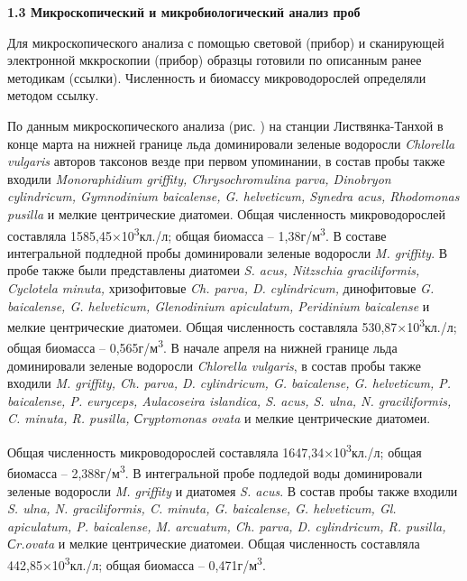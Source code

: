\documentclass[a4paper,12pt,openany,final]{extreport}
\begin{document}
\textbf{1.3 Микроскопический и микробиологический анализ проб }

Для микроскопического анализа с помощью световой (прибор) и сканирующей
электронной мккроскопии (прибор) образцы готовили по описанным ранее
методикам (ссылки). Численность и биомассу микроводорослей определяли
методом ссылку.

По данным микроскопического анализа (рис. ) на станции Листвянка-Танхой
в конце марта на нижней границе льда доминировали зеленые водоросли
\emph{Chlorella vulgaris} авторов таксонов везде при первом упоминании,
в состав пробы также входили \emph{Monoraphidium griffity,
Chrysochromulina parva, Dinobryon cylindricum, Gymnodinium baicalense,
G. helveticum, Synedra acus, Rhodomonas pusilla} и мелкие центрические
диатомеи. Общая численность микроводорослей составляла
1585,45×10\textsuperscript{3}кл./л; общая биомасса --
1,38г/м\textsuperscript{3}. В составе интегральной подледной пробы
доминировали зеленые водоросли \emph{M. griffity}. В пробе также были
представлены диатомеи \emph{S. acus, Nitzschia graciliformis, Cyclotela
minuta,} хризофитовые \emph{Ch. parva, D. cylindricum,} динофитовые
\emph{G. baicalense, G. helveticum, Glenodinium apiculatum, Peridinium
baicalense} и мелкие центрические диатомеи. Общая численность составляла
530,87×10\textsuperscript{3}кл./л; общая биомасса --
0,565г/м\textsuperscript{3}. В начале апреля на нижней границе льда
доминировали зеленые водоросли \emph{Chlorella vulgaris}, в состав пробы
также входили \emph{M. griffity, Ch. parva, D. cylindricum, G.
baicalense, G. helveticum, P. baicalense, P. euryceps, Aulacoseira
islandica, S. acus, S. ulna, N. graciliformis, C. minuta, R. pusilla,
Сryptomonas ovata} и мелкие центрические диатомеи.

Общая численность микроводорослей составляла
1647,34×10\textsuperscript{3}кл./л; общая биомасса --
2,388г/м\textsuperscript{3}. В интегральной пробе подледой воды
доминировали зеленые водоросли \emph{M. griffity} и диатомея \emph{S.
acus}. В состав пробы также входили \emph{S. ulna, N. graciliformis, C.
minuta, G. baicalense, G. helveticum, Gl. apiculatum, P. baicalense, M.
arcuatum, Ch. parva, D. cylindricum, R. pusilla, Сr.ovata} и мелкие
центрические диатомеи. Общая численность составляла
442,85×10\textsuperscript{3}кл./л; общая биомасса --
0,471г/м\textsuperscript{3}.
\end{document}
